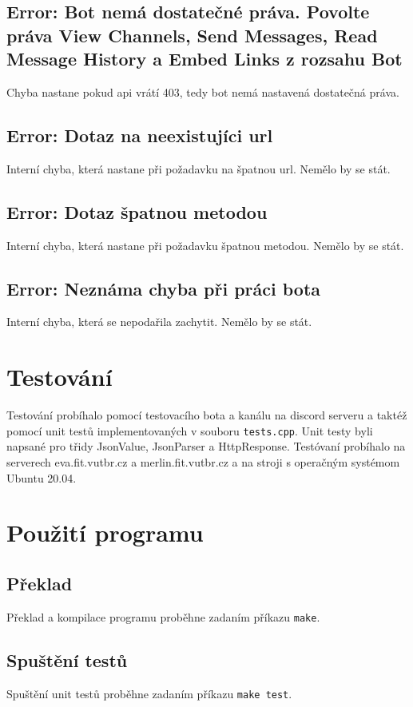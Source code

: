 \documentclass[a4paper,11pt]{article}
\begin{document}
\subsection{Error: Bot nemá dostatečné práva. Povolte práva View Channels, Send Messages, Read Message History a Embed Links z rozsahu Bot}
Chyba nastane pokud api vrátí 403, tedy bot nemá nastavená dostatečná práva.

\subsection{Error: Dotaz na neexistujíci url}
Interní chyba, která nastane při požadavku na špatnou url. Nemělo by se stát.

\subsection{Error: Dotaz špatnou metodou}
Interní chyba, která nastane při požadavku špatnou metodou. Nemělo by se stát.

\subsection{Error: Neznáma chyba při práci bota}
Interní chyba, která se nepodařila zachytit. Nemělo by se stát.

\section{Testování}
Testování probíhalo pomocí testovacího bota a kanálu na discord serveru a taktéž pomocí unit testů implementovaných v souboru \texttt{tests.cpp}. Unit testy byli napsané pro třidy JsonValue, JsonParser a HttpResponse. Testóvaní probíhalo na serverech eva.fit.vutbr.cz a merlin.fit.vutbr.cz a na stroji s operačným systémom Ubuntu 20.04.

\section{Použití programu}
\subsection{Překlad}
Překlad a kompilace programu proběhne zadaním příkazu \texttt{make}.

\subsection{Spuštění testů}
Spuštění unit testů proběhne zadaním příkazu \texttt{make test}.
\end{document}
